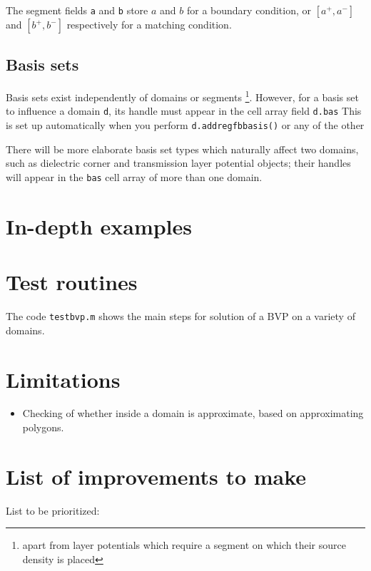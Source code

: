 \documentclass[12pt]{article}
\newcommand{\bi}{\begin{itemize}}
\newcommand{\ei}{\end{itemize}}
\begin{document}
The segment fields {\tt a} and {\tt b} store
$a$ and $b$ for a boundary condition, or
$[a^+, a^-]$ and $[b^+, b^-]$
respectively for a matching condition.

\subsection{Basis sets}

Basis sets exist independently of domains or segments
\footnote{apart from layer potentials which require a segment on which
their source density is placed}.
However, for a basis set to influence a domain {\tt d}, its handle must appear
in the cell array field {\tt d.bas}
This is set up automatically when you perform {\tt d.addregfbbasis()}
or any of the other 

There will be more elaborate basis set types which naturally affect two domains,
such as dielectric corner and transmission layer potential objects;
their handles will appear in the {\tt bas} cell array of more than one domain.


\section{In-depth examples}

\section{Test routines}

The code {\tt testbvp.m} shows the main steps for solution of a BVP on
a variety of domains.

\section{Limitations}

\bi
\item Checking of whether inside a domain is approximate, based on approximating
polygons.
\ei

\section{List of improvements to make}

List to be prioritized:
\end{document}

